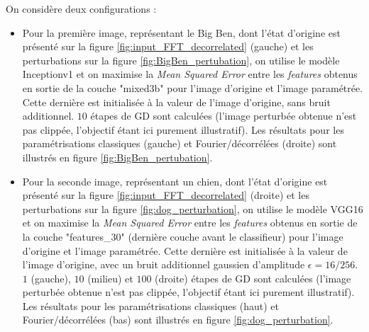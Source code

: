 \documentclass{article}
\begin{document}
\noindent On considère deux configurations :
\begin{itemize}
    \item Pour la première image, représentant le Big Ben, dont l'état d'origine est présenté sur la figure \ref{fig:input_FFT_decorrelated} (gauche) et les perturbations sur la figure \ref{fig:BigBen_pertubation}, on utilise le modèle Inceptionv1 et on maximise la \textit{Mean Squared Error} entre les \textit{features} obtenus en sortie de la couche "mixed3b" pour l'image d'origine et l'image paramétrée. Cette dernière est initialisée à la valeur de l'image d'origine, sans bruit additionnel. $10$ étapes de GD sont calculées (l'image perturbée obtenue n'est pas clippée, l'objectif étant ici purement illustratif). Les résultats pour les paramétrisations classiques (gauche) et Fourier/décorrélées (droite) sont illustrés en figure \ref{fig:BigBen_pertubation}.
    \item Pour la seconde image, représentant un chien, dont l'état d'origine est présenté sur la figure \ref{fig:input_FFT_decorrelated} (droite) et les perturbations sur la figure \ref{fig:dog_perturbation}, on utilise le modèle VGG16 et on maximise la \textit{Mean Squared Error} entre les \textit{features} obtenus en sortie de la couche "features\_30" (dernière couche avant le classifieur) pour l'image d'origine et l'image paramétrée. Cette dernière est initialisée à la valeur de l'image d'origine, avec un bruit additionnel gaussien d'amplitude $\epsilon = 16/256$. $1$ (gauche), $10$ (milieu) et $100$ (droite) étapes de GD sont calculées (l'image perturbée obtenue n'est pas clippée, l'objectif étant ici purement illustratif). Les résultats pour les paramétrisations classiques (haut) et Fourier/décorrélées (bas) sont illustrés en figure \ref{fig:dog_perturbation}.
\end{itemize}
\end{document}
